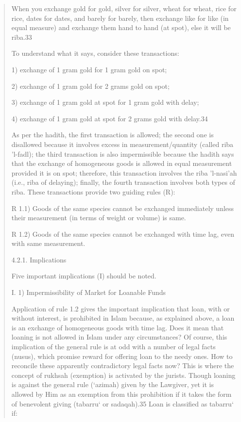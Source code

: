 \begin{quote}
When you exchange gold for gold, silver for silver, wheat for wheat, rice for rice, dates for dates, and barely for barely, then exchange like for like (in equal measure) and exchange them hand to hand (at spot), else it will be riba.33

To understand what it says, consider these transactions:

1) exchange of 1 gram gold for 1 gram gold on spot;

2) exchange of 1 gram gold for 2 grams gold on spot;

3) exchange of 1 gram gold at spot for 1 gram gold with delay;

4) exchange of 1 gram gold at spot for 2 grams gold with delay.34

As per the hadith, the first transaction is allowed; the second one is disallowed because it involves excess in measurement/quantity (called riba 'l-fadl); the third transaction is also impermissible because the hadith says that the exchange of homogeneous goods is allowed in equal measurement provided it is on spot; therefore, this transaction involves the riba 'l-nasi'ah (i.e., riba of delaying); finally, the fourth transaction involves both types of riba. These transactions provide two guiding rules (R):

R 1.1) Goods of the same species cannot be exchanged immediately unless their measurement (in terms of weight or volume) is same.

R 1.2) Goods of the same species cannot be exchanged with time lag, even with same measurement.

4.2.1. Implications

Five important implications (I) should be noted.

I. 1) Impermissibility of Market for Loanable Funds

Application of rule 1.2 gives the important implication that loan, with or without interest, is prohibited in Islam because, as explained above, a loan is an exchange of homogeneous goods with time lag. Does it mean that loaning is not allowed in Islam under any circumstances? Of course, this implication of the general rule is at odd with a number of legal facts (nusus), which promise reward for offering loan to the needy ones. How to reconcile these apparently contradictory legal facts now? This is where the concept of rukhsah (exemption) is activated by the jurists. Though loaning is against the general rule (‘azimah) given by the Lawgiver, yet it is allowed by Him as an exemption from this prohibition if it takes the form of benevolent giving (tabarru‘ or sadaqah).35 Loan is classified as tabarru‘ if:


\end{quote}
